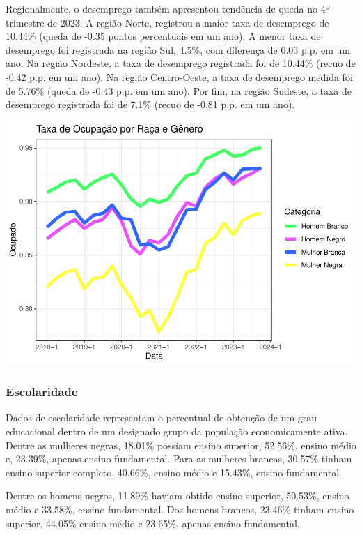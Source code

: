 \documentclass[
]{article}
\begin{document}
Regionalmente, o desemprego também apresentou tendência de queda no 4º
trimestre de 2023. A região Norte, registrou a maior taxa de desemprego
de 10.44\% (queda de -0.35 pontos percentuais em um ano). A menor taxa
de desemprego foi registrada na região Sul, 4.5\%, com diferença de 0.03
p.p. em um ano. Na região Nordeste, a taxa de desemprego registrada foi
de 10.44\% (recuo de -0.42 p.p. em um ano). Na região Centro-Oeste, a
taxa de desemprego medida foi de 5.76\% (queda de -0.43 p.p. em um ano).
Por fim, na região Sudeste, a taxa de desemprego registrada foi de 7.1\%
(recuo de -0.81 p.p. em um ano).

\includegraphics{R-Markdown--Long-Version-_files/figure-latex/unnamed-chunk-10-1.pdf}

\hypertarget{escolaridade}{%
\subsubsection{Escolaridade}\label{escolaridade}}

Dados de escolaridade representam o percentual de obtenção de um grau
educacional dentro de um designado grupo da população economicamente
ativa. Dentre as mulheres negras, 18.01\% possíam ensino superior,
52.56\%, ensino médio e, 23.39\%, apenas ensino fundamental. Para as
mulheres brancas, 30.57\% tinham ensino superior completo, 40.66\%,
ensino médio e 15.43\%, ensino fundamental.

Dentre os homens negros, 11.89\% haviam obtido ensino superior, 50.53\%,
ensino médio e 33.58\%, ensino fundamental. Dos homens brancos, 23.46\%
tinham ensino superior, 44.05\% ensino médio e 23.65\%, apenas ensino
fundamental.
\end{document}
